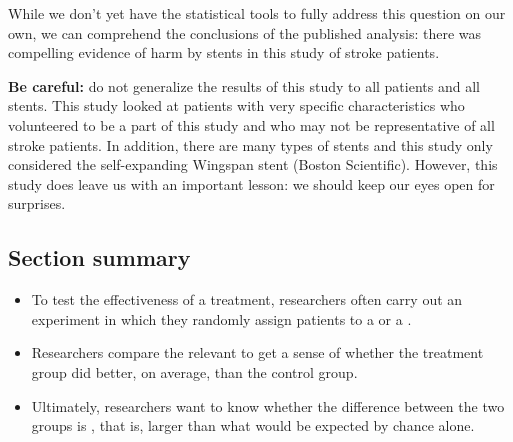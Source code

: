 \D{\newpage}

While we don't yet have the statistical tools to fully address this question on our own, we can comprehend the conclusions of the published analysis: there was compelling evidence of harm by stents in this study of stroke patients.

\textbf{Be careful:} do not generalize the results of this study to all patients and all stents. This study looked at patients with very specific characteristics who volunteered to be a part of this study and who may not be representative of all stroke patients. In addition, there are many types of stents and this study only considered the self-expanding Wingspan stent (Boston Scientific). However, this study does leave us with an important lesson: we should keep our eyes open for surprises.




\subsection*{Section summary}
\begin{itemize}
\item To test the effectiveness of a treatment, researchers often carry out an experiment in which they randomly assign patients to a  or a .  
\item Researchers compare the relevant  to get a sense of whether the treatment group did better, on average, than the control group.
\item Ultimately, researchers want to know whether the difference between the two groups is \mbox{}, that is, larger than what would be expected by chance alone.
\end{itemize}

{}

